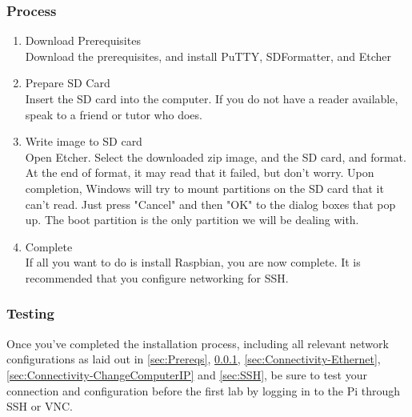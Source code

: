 \subsubsection{Process}
\label{sec:Process}
\begin{enumerate}
    \item Download Prerequisites\\
        Download the prerequisites, and install PuTTY, SDFormatter, and Etcher
    \item Prepare SD Card\\
        Insert the SD card into the computer. If you do not have a reader available, speak to a friend or tutor who does.
    \item Write image to SD card\\
        Open Etcher. Select the downloaded zip image, and the SD card, and format. At the end of format, it may read that it failed,  but don't worry. Upon completion, Windows will try to mount partitions on the SD card that it can't read. Just press "Cancel" and then "OK" to the dialog boxes that pop up. The boot partition is the only partition we will be dealing with.
    \item Complete\\
        If all you want to do is install Raspbian, you are now complete. It is recommended that you configure networking for SSH.
\end{enumerate}

\subsubsection{Testing}
Once you've completed the installation process, including all relevant network configurations as laid out in \ref{sec:Prereqs}, \ref{sec:Process}, \ref{sec:Connectivity-Ethernet}, \ref{sec:Connectivity-ChangeComputerIP} and \ref{sec:SSH}, be sure to test your connection and configuration before the first lab by logging in to the Pi through SSH or VNC.